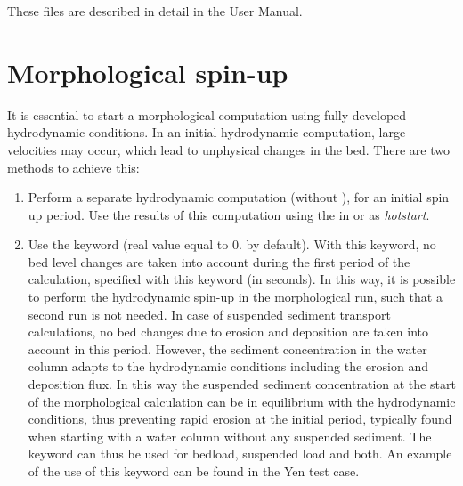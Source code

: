 These files are described in detail in the \nestor User Manual.

\section{Morphological spin-up}
It is essential to start a morphological computation using fully developed hydrodynamic conditions. In an initial hydrodynamic computation, large velocities may occur, which lead to unphysical changes in the bed. There are two methods to achieve this:
\begin{enumerate}
\item Perform a separate hydrodynamic computation (without \gaia), for an initial spin up period. Use the results of this computation using the  in  or  as \textit{hotstart}.
\item Use the keyword   (real value equal to 0. by default). With this keyword, no bed level changes are taken into account during the first period of the calculation, specified with this keyword (in seconds). In this way, it is possible to perform the hydrodynamic spin-up in the morphological run, such that a second run is not needed.  In case of suspended sediment transport calculations, no bed changes due to erosion and deposition are taken into account in this period. However, the sediment concentration in the water column adapts to the hydrodynamic conditions including the erosion and deposition flux. In this way the suspended sediment concentration at the start of the morphological calculation can be in equilibrium with the hydrodynamic conditions, thus preventing rapid erosion at the initial period, typically found when starting with a water column without any suspended sediment. The keyword can thus be used for bedload, suspended load and both. An example of the use of this keyword can be found in the Yen test case.
\end{enumerate}



